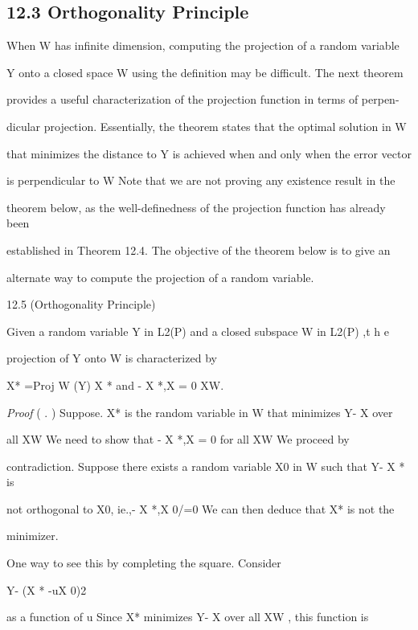 \subsection*{12.3 Orthogonality Principle}

When W has infinite dimension, computing the projection of a random variable

Y onto a closed space W using the definition may be difficult. The next theorem

provides a useful characterization of the projection function in terms of perpen-

dicular projection. Essentially, the theorem states that the optimal solution in W

that minimizes the distance to Y is achieved when and only when the error vector

is perpendicular to W Note that we are not proving any existence result in the

theorem below, as the well-definedness of the projection function has already been

established in Theorem 12.4. The objective of the theorem below is to give an

alternate way to compute the projection of a random variable.

\begin{thmbox}{12.5 (Orthogonality Principle)}
\end{thmbox}

Given a random variable Y in L2(P) and a closed subspace W in L2(P) ,t h e

projection of Y onto W is characterized by

X* =Proj W (Y) X * \inW and \langleY- X *,X \rangle= 0 X\in W.

\textit{Proof} ( . ) Suppose. X* is the random variable in W that minimizes Y- X over

all X\in W We need to show that \langleY- X *,X \rangle= 0 for all X\in W We proceed by

contradiction. Suppose there exists a random variable X0 in W such that Y- X * is

not orthogonal to X0, ie.,\langleY- X *,X 0\rangle /=0 We can then deduce that X* is not the

minimizer.

One way to see this by completing the square. Consider

Y- (X * -uX 0)2

as a function of u Since X* minimizes Y- X over all X\in W , this function is

